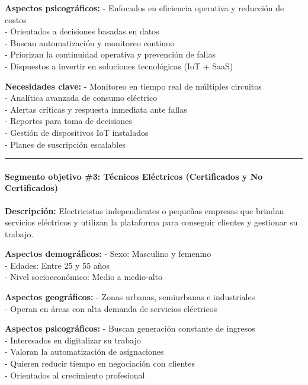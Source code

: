 \textbf{Aspectos psicográficos:} - Enfocados en eficiencia operativa y
reducción de costos\\
- Orientados a decisiones basadas en datos\\
- Buscan automatización y monitoreo continuo\\
- Priorizan la continuidad operativa y prevención de fallas\\
- Dispuestos a invertir en soluciones tecnológicas (IoT + SaaS)

\textbf{Necesidades clave:} - Monitoreo en tiempo real de múltiples
circuitos\\
- Analítica avanzada de consumo eléctrico\\
- Alertas críticas y respuesta inmediata ante fallas\\
- Reportes para toma de decisiones\\
- Gestión de dispositivos IoT instalados\\
- Planes de suscripción escalables

\begin{center}\rule{0.5\linewidth}{0.5pt}\end{center}

\paragraph{Segmento objetivo \#3: Técnicos Eléctricos (Certificados y No
Certificados)}\label{report__10-cap1-introduccion.md__segmento-objetivo-3-tuxe9cnicos-eluxe9ctricos-certificados-y-no-certificados}

\hfill\break

\textbf{Descripción:} Electricistas independientes o pequeñas empresas
que brindan servicios eléctricos y utilizan la plataforma para conseguir
clientes y gestionar su trabajo.

\textbf{Aspectos demográficos:} - Sexo: Masculino y femenino\\
- Edades: Entre 25 y 55 años\\
- Nivel socioeconómico: Medio a medio-alto

\textbf{Aspectos geográficos:} - Zonas urbanas, semiurbanas e
industriales\\
- Operan en áreas con alta demanda de servicios eléctricos

\textbf{Aspectos psicográficos:} - Buscan generación constante de
ingresos\\
- Interesados en digitalizar su trabajo\\
- Valoran la automatización de asignaciones\\
- Quieren reducir tiempo en negociación con clientes\\
- Orientados al crecimiento profesional


